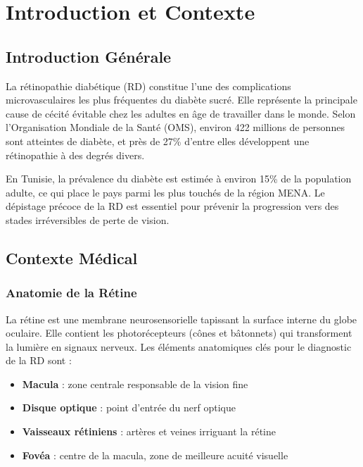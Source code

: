 \documentclass[12pt,a4paper,oneside]{report}
\begin{document}
\tableofcontents
\listoffigures
\listoftables

\newpage

\chapter{Introduction et Contexte}

\section{Introduction Générale}

La rétinopathie diabétique (RD) constitue l'une des complications
microvasculaires les plus fréquentes du diabète sucré. Elle représente
la principale cause de cécité évitable chez les adultes en âge de travailler
dans le monde. Selon l'Organisation Mondiale de la Santé (OMS), environ 422
millions de personnes sont atteintes de diabète, et près de 27\% d'entre
elles développent une rétinopathie à des degrés divers.

En Tunisie, la prévalence du diabète est estimée à environ 15\% de la
population adulte, ce qui place le pays parmi les plus touchés de la région
MENA. Le dépistage précoce de la RD est essentiel pour prévenir la
progression vers des stades irréversibles de perte de vision.

\section{Contexte Médical}

\subsection{Anatomie de la Rétine}

La rétine est une membrane neurosensorielle tapissant la surface interne
du globe oculaire. Elle contient les photorécepteurs (cônes et bâtonnets)
qui transforment la lumière en signaux nerveux. Les éléments anatomiques
clés pour le diagnostic de la RD sont :

\begin{itemize}
    \item \textbf{Macula} : zone centrale responsable de la vision fine
    \item \textbf{Disque optique} : point d'entrée du nerf optique
    \item \textbf{Vaisseaux rétiniens} : artères et veines irriguant la rétine
    \item \textbf{Fovéa} : centre de la macula, zone de meilleure acuité visuelle
\end{itemize}
\end{document}
